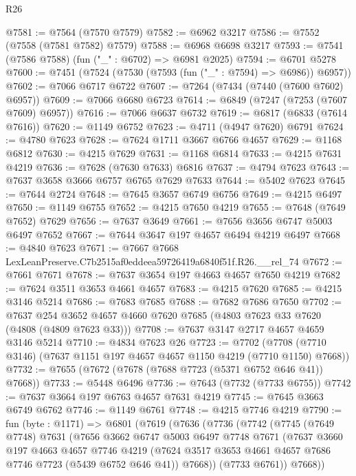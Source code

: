 \begin{lexlean}{R26}
\begin{coremodule}
@7581 := @7564 (@7570 @7579)
@7582 := @6962 @3217
@7586 := @7552 (@7558 (@7581 @7582) @7579)
@7588 := @6968 @6698 @3217
@7593 := @7541 (@7586 @7588) (fun ("_" : @6702) => @6981 @2025)
@7594 := @6701 @5278
@7600 := @7451 (@7524 (@7530 (@7593 (fun ("_" : @7594) => @6986)) @6957))
@7602 := @7066 @6717 @6722
@7607 := @7264 (@7434 (@7440 (@7600 @7602) @6957))
@7609 := @7066 @6680 @6723
@7614 := @6849 (@7247 (@7253 (@7607 @7609) @6957))
@7616 := @7066 @6637 @6732
@7619 := @6817 (@6833 (@7614 @7616))
@7620 := @1149 @6752
@7623 := @4711 (@4947 @7620) @6791
@7624 := @4780 @7623
@7628 := @7624 @1711 @3667 @6766 @4657
@7629 := @1168 @6812
@7630 := @4215 @7629
@7631 := @1168 @6814
@7633 := @4215 @7631 @4219
@7636 := @7628 (@7630 @7633) @6816
@7637 := @4794 @7623
@7643 := @7637 @3658 @3666 @6757 @6765 @7629 @7633
@7644 := @5402 @7623
@7645 := @7644 @2724
@7648 := @7645 @3657 @6749 @6756
@7649 := @4215 @6497
@7650 := @1149 @6755
@7652 := @4215 @7650 @4219
@7655 := @7648 (@7649 @7652) @7629
@7656 := @7637 @3649
@7661 := @7656 @3656 @6747 @5003 @6497 @7652
@7667 := @7644 @3647 @197 @4657 @6494 @4219 @6497
@7668 := @4840 @7623
@7671 := @7667 @7668 LexLeanPreserve.C7b2515af0eddeea59726419a6840f51f.R26.__rel_74
@7672 := @7661 @7671
@7678 := @7637 @3654 @197 @4663 @4657 @7650 @4219
@7682 := @7624 @3511 @3653 @4661 @4657
@7683 := @4215 @7620
@7685 := @4215 @3146 @5214
@7686 := @7683 @7685
@7688 := @7682 @7686 @7650
@7702 := @7637 @254 @3652 @4657 @4660 @7620 @7685 (@4803 @7623 @33 @7620 (@4808 (@4809 @7623 @33)))
@7708 := @7637 @3147 @2717 @4657 @4659 @3146 @5214
@7710 := @4834 @7623 @26
@7723 := @7702 (@7708 (@7710 @3146) (@7637 @1151 @197 @4657 @4657 @1150 @4219 (@7710 @1150) @7668))
@7732 := @7655 (@7672 (@7678 (@7688 @7723 (@5371 @6752 @646 @41)) @7668))
@7733 := @5448 @6496
@7736 := @7643 (@7732 (@7733 @6755))
@7742 := @7637 @3664 @197 @6763 @4657 @7631 @4219
@7745 := @7645 @3663 @6749 @6762
@7746 := @1149 @6761
@7748 := @4215 @7746 @4219
@7790 := fun (byte : @1171) =>
  @6801
    (@7619
      (@7636
        (@7736
          (@7742
            (@7745
              (@7649 @7748)
              @7631
              (@7656
                @3662
                @6747
                @5003
                @6497
                @7748
                @7671
                (@7637
                  @3660
                  @197
                  @4663
                  @4657
                  @7746
                  @4219
                  (@7624 @3517 @3653 @4661 @4657 @7686 @7746 @7723 (@5439 @6752 @646 @41))
                  @7668))
              (@7733 @6761))
            @7668))

\end{coremodule}
\end{lexlean}
